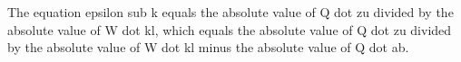 The equation epsilon sub k equals the absolute value of Q dot zu divided by the absolute value of W dot kl, which equals the absolute value of Q dot zu divided by the absolute value of W dot kl minus the absolute value of Q dot ab.